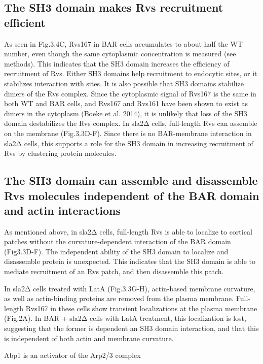 \subsection{The SH3 domain makes Rvs recruitment efficient} 
As seen in Fig.3.4C, Rvs167 in BAR cells accumulates to about half the WT number, even though the same cytoplasmic concentration is measured (see methods). This indicates that the SH3 domain increases the efficiency of recruitment of Rvs. Either SH3 domains help recruitment to endocytic sites, or it stabilizes interaction with sites. It is also possible that SH3 domains stabilize dimers of the Rvs complex. Since the cytoplasmic signal of Rvs167 is the same in both WT and BAR cells, and Rvs167 and Rvs161 have been shown to exist as dimers in the cytoplasm (Boeke et al. 2014), it is unlikely that loss of the SH3 domain destabilizes the Rvs complex. In sla2Δ cells, full-length Rvs can assemble on the membrane (Fig.3.3D-F). Since there is no BAR-membrane interaction in sla2Δ cells, this supports a role for the SH3 domain in increasing recruitment of Rvs by clustering protein molecules. 


\subsection{The SH3 domain can assemble and disassemble Rvs molecules independent of the BAR domain and actin interactions} 
As mentioned above, in sla2Δ cells, full-length Rvs is able to localize to cortical patches without the curvature-dependent interaction of the BAR domain (Fig3.3D-F). The independent ability of the SH3 domain to localize and disassemble protein is unexpected. This indicates that the SH3 domain is able to mediate recruitment of an Rvs patch, and then disassemble this patch. 

	\vspace{5mm}
In sla2Δ cells treated with LatA (Fig.3.3G-H), actin-based membrane curvature, as well as actin-binding proteins are removed from the plasma membrane. Full-length Rvs167 in these cells show transient localizations at the plasma membrane (Fig.2A). In BAR + sla2Δ cells with LatA treatment, this localization is lost, suggesting that the former is dependent an SH3 domain interaction, and that this is independent of both actin and membrane curvature. 

Abp1 is an activator of the Arp2/3 complex 

